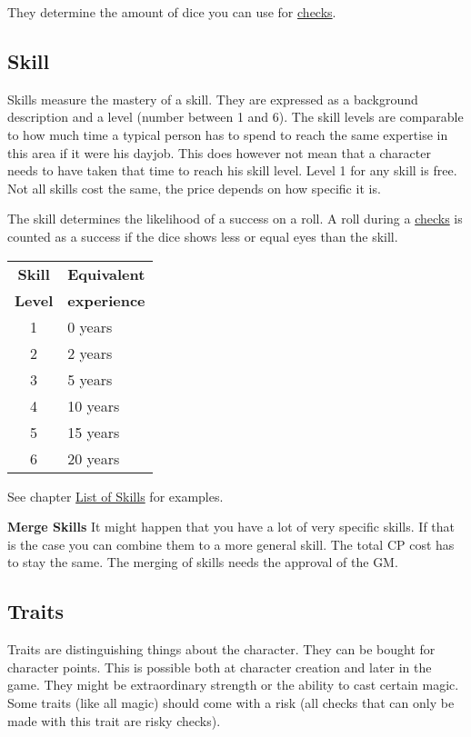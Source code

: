\documentclass[11pt]{article}
\begin{document}
{\begin{multicols}{2}[]
They determine the amount of dice you can use for \hyperref[sec:orgf6092f9]{checks}. 

\subsection{Skill}
\label{sec:org7caf8e7}

Skills measure the mastery of a skill. They are expressed as a background description and a level (number between 1 and 6). The skill levels are comparable to how much time a typical person has to spend to reach the same expertise in this area if it were his dayjob. This does however not mean that a character needs to have taken that time to reach his skill level. Level 1 for any skill is free. Not all skills cost the same, the price depends on how specific it is.

The skill determines the likelihood of a success on a roll. A roll during a \hyperref[sec:orgf6092f9]{checks} is counted as a success if the dice shows less or equal eyes than the skill.


\begin{center}
\begin{tabular}{c|l}
\textbf{Skill} & \textbf{Equivalent}\\
\textbf{Level} & \textbf{experience}\\
\hline
1 & 0 years\\
2 & 2 years\\
3 & 5 years\\
4 & 10 years\\
5 & 15 years\\
6 & 20 years\\
\end{tabular}
\end{center}

See chapter \hyperref[sec:org1dedbd6]{List of Skills} for examples.

\textbf{Merge Skills}
It might happen that you have a lot of very specific skills. If that is the case you can combine them to a more general skill. The total CP cost has to stay the same. The merging of skills needs the approval of the GM.

\subsection{Traits}
\label{sec:orgbe2a803}
Traits are distinguishing things about the character. They can be bought for character points. This is possible both at character creation and later in the game.
They might be extraordinary strength or the ability to cast certain magic. Some traits (like all magic) should come with a risk (all checks that can only be made with this trait are risky checks).


\end{multicols}}
\end{document}
